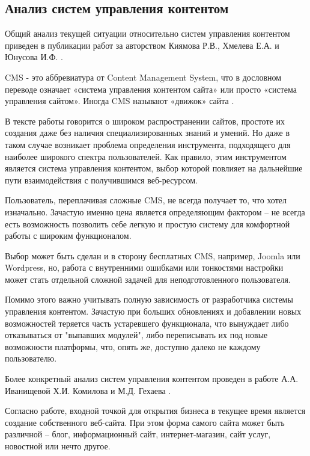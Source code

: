 \subsection{Анализ систем управления контентом}

Общий анализ текущей ситуации относительно систем управления контентом приведен в публикации работ за авторством Киямова Р.В., Хмелева Е.А. и Юнусова И.Ф. \cite{kiyamov-cms}.

CMS - это аббревиатура от Content Management System, что в дословном переводе означает «система управления контентом сайта» или просто «система управления сайтом».
Иногда CMS называют «движок» сайта \cite{kiyamov-cms-1}.

В тексте работы говорится о широком распространении сайтов, простоте их создания даже без наличия специализированных знаний и умений.
Но даже в таком случае возникает проблема определения инструмента, подходящего для наиболее широкого спектра пользователей.
Как правило, этим инструментом является система управления контентом, выбор которой повлияет на дальнейшие пути взаимодействия с получившимся веб-ресурсом.

Пользователь, переплачивая сложные CMS, не всегда получает то, что хотел изначально.
Зачастую именно цена является определяющим фактором -- не всегда есть возможность позволить себе легкую и простую систему для комфортной работы с широким функционалом.

Выбор может быть сделан и в сторону бесплатных CMS, например, Joomla или Wordpress, но, работа с внутренними ошибками или тонкостями настройки может стать отдельной сложной задачей для неподготовленного пользователя.

Помимо этого важно учитывать полную зависимость от разработчика системы управления контентом.
Зачастую при больших обновлениях и добавлении новых возможностей теряется часть устаревшего функционала, что вынуждает либо отказываться от "выпавших модулей", либо переписывать их под новые возможности платформы, что, опять же, доступно далеко не каждому пользователю.

Более конкретный анализ систем управления контентом проведен в работе А.А. Иванищевой Х.И. Комилова и М.Д. Гехаева \cite{ivanisheva-cms}.

Согласно работе, входной точкой для открытия бизнеса в текущее время является создание собственного веб-сайта.
При этом форма самого сайта может быть различной -- блог, информационный сайт, интернет-магазин, сайт услуг, новостной или нечто другое.

